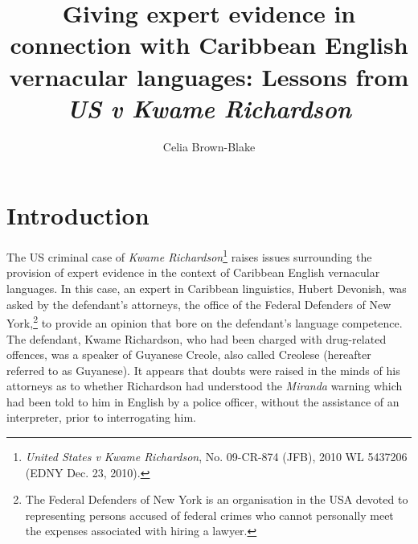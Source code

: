 \documentclass[output=paper,colorlinks,citecolor=brown]{langscibook}
\author{Celia Brown-Blake\affiliation{The University of the West Indies, Mona}}
\title[Giving expert evidence in Caribbean English vernacular languages]      {Giving expert evidence in connection with Caribbean English vernacular languages: Lessons from \emph{US v Kwame Richardson}}
\begin{document}
\maketitle

\section{Introduction}

The US criminal case of \emph{Kwame Richardson}\footnote{\emph{United States v Kwame Richardson}, No. 09-CR-874 (JFB), 2010 WL 5437206 (EDNY Dec. 23, 2010).} raises issues surrounding the provision of expert evidence in the context of Caribbean English vernacular languages. In this case, an expert in Caribbean linguistics, Hubert Devonish, was asked by the defendant’s attorneys, the office of the Federal Defenders of New York,\footnote{The Federal Defenders of New York is an organisation in the USA devoted to representing persons accused of federal crimes who cannot personally meet the expenses associated with hiring a lawyer.} to provide an opinion that bore on the defendant’s language competence. The defendant, Kwame Richardson, who had been charged with drug-related offences, was a speaker of Guyanese Creole, also called Creolese (hereafter referred to as Guyanese). It appears that doubts were raised in the minds of his attorneys as to whether Richardson had understood the \emph{Miranda} warning which had been told to him in English by a police officer, without the assistance of an interpreter, prior to interrogating him.
\end{document}
